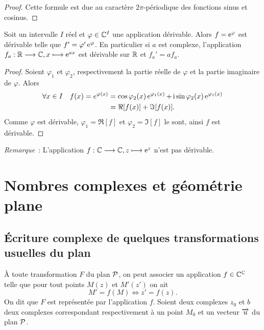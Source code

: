 \begin{proof}
    Cette formule est due au caractère \(2\pi\)-périodique des fonctions sinus 
    et cosinus.
\end{proof}

\begin{prop}
    Soit un intervalle \(I\) réel et \(\varphi \in \C^{I}\) une application 
    dérivable. Alors \(f = \e^\varphi\) est dérivable telle que \(f' = \varphi' 
    \e^\varphi\). En particulier si \(a\) est complexe, l'application 
    \(\fonctionL{f_a}{\R}{\C}{x}{\e^{ax}}\) est dérivable sur \(\R\) et 
    \(f_a' = af_a\).
\end{prop}

\begin{proof}
    Soient \(\varphi_1\) et \(\varphi_2\), respectivement la partie réelle de 
    \(\varphi\) et la partie imaginaire de \(\varphi\). Alors
    \begin{align*}
        \forall x \in I \quad f(x) = e^{\varphi(x)}& = \cos \varphi_2(x) 
        \e^{\varphi_1(x)}+ \ii \sin \varphi_2(x)\e^{\varphi_1(x)} \\
                                                 &= \Re[f(x)] + \Im[f(x)].
    \end{align*}
    Comme \(\varphi\) est dérivable, \(\varphi_1 = \Re[f]\) et 
    \(\varphi_2 = \Im[f]\) le sont, ainsi \(f\) est dérivable.
\end{proof}

\emph{Remarque}~: L'application \(\fonctionL{f}{\C}{\C}{z}{\e^z}\) n'est pas 
dérivable.

\section{Nombres complexes et géométrie plane}
\label{sec:complexesetgeometrie}

\subsection{Écriture complexe de quelques transformations usuelles du plan}
\label{subsec:ecriturecomplexeettransformations}

À toute transformation \(F\) du plan \(\P\), on peut associer un application \(f 
\in \C^{\C}\) telle que pour tout points \(M(z)\) et \(M'(z')\) on ait
\begin{equation}
    M' = f(M) \iff z' = f(z).
\end{equation}
On dit que \(F\) est représentée par l'application \(f\). Soient deux complexes 
\(z_0\) et \(b\) deux complexes correspondant respectivement à un point \(M_0\) 
et un vecteur \(\vect{u}\) du plan \(\P\).


